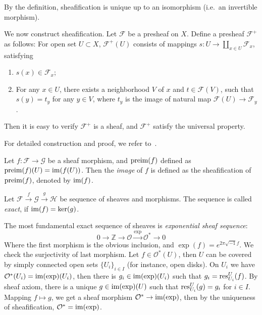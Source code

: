 By the definition, sheafification is unique up to an isomorphism (i.e.\ an invertible morphism).
\begin{cons}
    We now construct sheafification.
    Let $\mathcal{F}$ be a presheaf on $X$.
    Define a presheaf $\mathcal{F}^+$ as follows:
    For open set $U\subset X$, $\mathcal{F}^+(U)$ consists of mappings $s:U\to\coprod_{x\in U}\mathcal{F}_x$,
    satisfying
    \begin{enumerate}[(1)]
        \item $s(x)\in\mathcal{F}_x$;
        \item For any $x\in U$, there exists a neighborhood $V$ of $x$ and $t\in\mathcal{F}(V)$, such that $s(y)=t_y$ for any $y\in V$, where $t_y$ is the image of natural map $\mathcal{F}(U)\to\mathcal{F}_y$. 
    \end{enumerate}
    Then it is easy to verify $\mathcal{F}^+$ is a sheaf, and $\mathcal{F}^+$ satisfy the universal property.
\end{cons}
For detailed construction and proof, we refer to~\cite[Section 6.17]{stacks-project}.

\begin{defn}
    Let $f:\mathcal{F}\to\mathcal{G}$ be a sheaf morphism, and $\operatorname{preim}(f)$ defined as $\operatorname{preim}(f)(U)=\operatorname{im}(f(U))$.
    Then the \emph{image} of $f$ is defined as the sheafification of $\operatorname{preim}(f)$, denoted by $\operatorname{im}(f)$.
\end{defn}

\begin{defn}
    Let $\mathcal{F}\xrightarrow{f}\mathcal{G}\xrightarrow{g}\mathcal{H}$ be sequence of sheaves and morphisms.
    The sequence is called \emph{exact}, if $\operatorname{im}(f)=\ker(g)$.
\end{defn}

\begin{eg}
    The most fundamental exact sequence of sheaves is \emph{exponential sheaf sequence}:
    \[0\to\mathbb{Z}\to\mathcal{O}\xrightarrow{\exp}\mathcal{O}^*\to 0\]
    Where the first morphism is the obvious inclusion, and $\exp(f)=e^{2\pi\sqrt{-1}f}$.
    We check the surjectivity of last morphism.
    Let $f\in\mathcal{O}^*(U)$, then $U$ can be covered by simply connected open sets $\{U_i\}_{i\in I}$ (for instance, open disks).
    On $U_i$ we have $\mathcal{O}^*(U_i)=\operatorname{im}(\exp)(U_i)$, then there is $g_i\in\operatorname{im}(\exp)(U_i)$ such that $g_i=\operatorname{res}^U_{U_i}(f)$.
    By sheaf axiom, there is a unique $g\in\operatorname{im}(\exp)(U)$ such that $\operatorname{res}^U_{U_i}(g)=g_i$ for $i\in I$.
    Mapping $f\mapsto g$, we get a sheaf morphism $\mathcal{O}^*\to\operatorname{im}(\exp)$, then by the uniqueness of sheafification, $\mathcal{O}^*=\operatorname{im}(\exp)$.
\end{eg}

